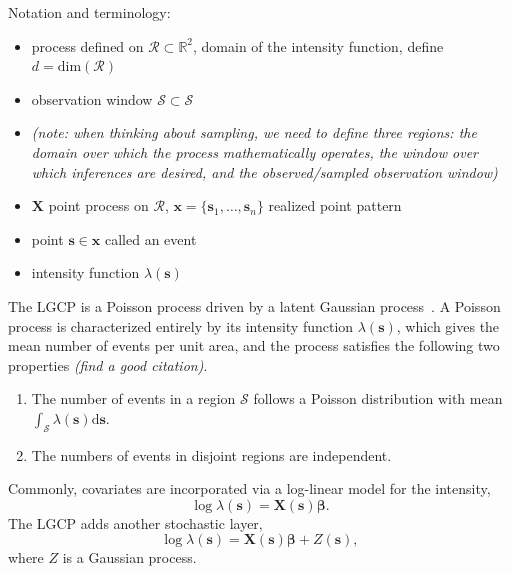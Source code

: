 \documentclass[]{interact}
\begin{document}
Notation and terminology:

\begin{itemize}

\item process defined on \(\mathcal{R} \subset \mathbb{R}^{2}\), domain of the
intensity function, define \(d = \mathrm{dim}(\mathcal{R})\)

\item observation window \(\mathcal{S} \subset \mathcal{S}\)

\item \emph{(note: when thinking about sampling, we need to define three
regions: the domain over which the process mathematically operates, the window
over which inferences are desired, and the observed/sampled observation window)}

\item \(\mathbf{X}\) point process on \(\mathcal{R}\),
\(\mathbf{x} = \{\mathbf{s}_{1}, \dots, \mathbf{s}_{n}\}\) realized point
pattern

\item point \(\mathbf{s} \in \mathbf{x}\) called an event

\item intensity function \(\lambda(\mathbf{s})\)

\end{itemize}


The LGCP is a Poisson process driven by a latent Gaussian
process~\cite{moelleretal}. A Poisson process is characterized entirely by its
intensity function \(\lambda(\mathbf{s})\), which gives the mean number of events
per unit area, and the process satisfies the following two properties
{\it (find a good citation)}.
\begin{enumerate}
\item The number of events in a region \(\mathcal{S}\) follows a Poisson
distribution with mean
\(\int_{\mathcal{S}} \lambda(\mathbf{s})\mathrm{d}\mathbf{s}\).
\item The numbers of events in disjoint regions are independent.
\end{enumerate}

Commonly, covariates are incorporated via a log-linear model for the intensity,
\begin{displaymath}
\log\lambda(\mathbf{s}) = \mathbf{X}(\mathbf{s}) \boldsymbol{\beta}.
\end{displaymath}
The LGCP adds another stochastic layer,
\begin{displaymath}
\log\lambda(\mathbf{s}) = \mathbf{X}(\mathbf{s}) \boldsymbol{\beta}
+ Z(\mathbf{s}),
\end{displaymath}
where \(Z\) is a Gaussian process.
\end{document}
